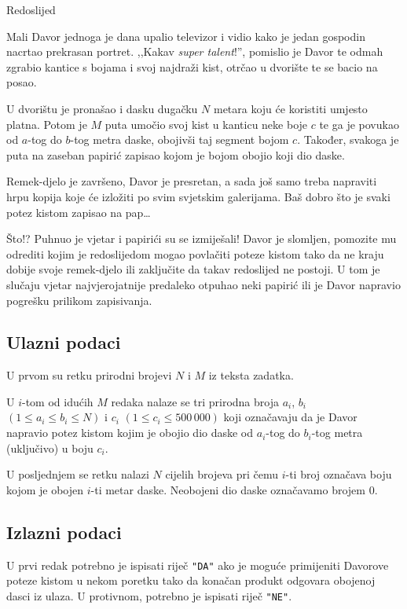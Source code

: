 \begin{statement}[
  problempoints=100,
  timelimit=1 sekunda,
  memorylimit=512 MiB,
]{Redoslijed}

Mali Davor jednoga je dana upalio televizor i vidio kako je jedan gospodin
nacrtao prekrasan portret. ,,Kakav \textit{super talent}!'', pomislio je
Davor te odmah zgrabio kantice s bojama i svoj najdraži kist, otrčao u
dvorište te se bacio na posao.

U dvorištu je pronašao i dasku dugačku $N$ metara koju će koristiti umjesto
platna. Potom je $M$ puta umočio svoj kist u kanticu neke boje $c$ te ga je
povukao od $a$-tog do $b$-tog metra daske, obojivši taj segment bojom $c$.
Također, svakoga je puta na zaseban papirić zapisao kojom je bojom obojio
koji dio daske.

Remek-djelo je završeno, Davor je presretan, a sada još samo treba napraviti
hrpu kopija koje će izložiti po svim svjetskim galerijama. Baš dobro što je
svaki potez kistom zapisao na pap\dots

Što!? Puhnuo je vjetar i papirići su se izmiješali! Davor je slomljen, pomozite
mu odrediti kojim je redoslijedom mogao povlačiti poteze kistom tako da ne
kraju dobije svoje remek-djelo ili zaključite da takav redoslijed ne postoji.
U tom je slučaju vjetar najvjerojatnije predaleko otpuhao neki papirić ili je
Davor napravio pogrešku prilikom zapisivanja.

\subsection*{Ulazni podaci}
U prvom su retku prirodni brojevi $N$ i $M$ iz teksta zadatka.

U $i$-tom od idućih $M$ redaka nalaze se tri prirodna broja $a_i$, $b_i$ $(1
\le a_i \le b_i \le N)$ i $c_i$ $(1 \le c_i \le 500\,000)$ koji označavaju da
je Davor napravio potez kistom kojim je obojio dio daske od $a_i$-tog do
$b_i$-tog metra (uključivo) u boju $c_i$.

U posljednjem se retku nalazi $N$ cijelih brojeva pri čemu $i$-ti broj označava
boju kojom je obojen $i$-ti metar daske. Neobojeni dio daske označavamo brojem
$0$.

\subsection*{Izlazni podaci}
U prvi redak potrebno je ispisati riječ \texttt{"DA"} ako je moguće primijeniti
Davorove poteze kistom u nekom poretku tako da konačan produkt odgovara obojenoj
dasci iz ulaza. U protivnom, potrebno je ispisati riječ \texttt{"NE"}.


\end{statement}
